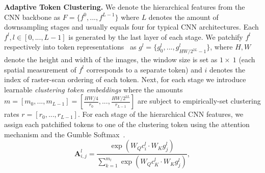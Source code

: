 \documentclass[sigconf]{acmart}
\begin{document}

\noindent\textbf{Adaptive Token Clustering.}
We denote the hierarchical features from the CNN backbone as $F=\{f^0,...,f^{L-1}\}$ where $L$ denotes the amount of downsampling stages and usually equals four for typical CNN architectures.
Each $f^l, l\in[0,...,L-1]$ is generated by the last layer of each stage.
We patchify $f^l$ respectively into token representations~\cite{Swin} as $g^l=\{g_0^l,...,g_{HW/2^{2L}-1}^l\}$, where $H, W$ denote the height and width of the images, the window size is set as $1\times~1$ (each spatial measurement of $f^l$ corresponds to a separate token) and $i$ denotes the index of raster-scan ordering of each token.
Next, for each stage we introduce learnable \textit{clustering token embeddings} 
where the amounts $m=[m_0,...,m_{L-1}]=[\frac{HW/4}{r_0},...,\frac{HW/2^{2L}}{r_{L-1}}]$ are subject to empirically-set clustering rates $r=[r_0,...,r_{L-1}]$.
For each stage of the hierarchical CNN features, we assign each patchified tokens to one of the clustering token using the attention mechanism and the Gumble Softmax~\cite{Gumbel}.
\begin{equation}
\label{eqn:cluster}
    \mathbf{A}_{i, j}^l = \frac{\exp(W_Q{c}_i^{l} {\cdot} W_K{g}_j^l)}{\sum_{k=1}^{m_{l}} \exp(W_Q{c}_K^l{\cdot} W_K{g}_j^l)},
\end{equation}
\end{document}
